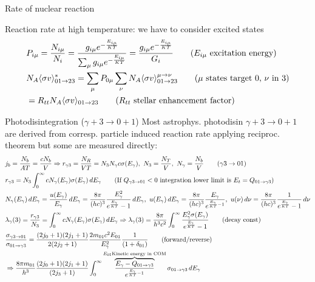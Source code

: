 \begin{frame}{Rate of nuclear reaction}
\begin{block}{Reaction rate at high temperature: we have to consider excited states}
        \begin{align*}
        &P_{i\mu}=\frac{N_{i\mu}}{N_i}=\frac{g_{i\mu}\exp{-\frac{E_{i\mu}}{KT}}}{\sum_{\mu}g_{i\mu}\exp{-\frac{E_{i\mu}}{KT}}}=\frac{g_{i\mu}\exp{-\frac{E_{i\mu}}{KT}}}{G_i}\tag{$E_{i\mu}$ excitation energy}\\
        &N_A\exv{\sigma v}^*_{01\to23}=\sum_{\mu}P_{0\mu}\sum_{\nu}N_A\exv{\sigma v}^{\mu\to\nu}_{01\to23}\tag{$\mu$ states target 0, $\nu$ in 3}\\
        &=R_{tt}N_A\exv{\sigma v}_{01\to23}\tag{$R_{tt}$ stellar enhancement factor}
    \end{align*}
    \end{block}
\end{frame}

\begin{frame}{Photodisintegration ($\gamma+3\to0+1$)}
    Most astrophys. photodisin $\gamma+3\to0+1$ are derived from corresp. particle induced reaction rate applying reciproc. theorem but some are measured directly:
    \begin{align*}
        &j_b=\frac{N_b}{AT}=\frac{cN_b}{V}\Rightarrow r_{\gamma3}=\frac{N_R}{VT}=N_3N_{\gamma}c\sigma(E_{\gamma}),\ N_3=\frac{N_T}{V},\ N_{\gamma}=\frac{N_b}{V}\tag{$\gamma3\to01$}\\
        &r_{\gamma3}=N_3\int_0^{\infty}cN_{\gamma}(E_{\gamma})\sigma(E_{\gamma})\,dE_{\gamma}\tag{If $Q_{\gamma3\to01}<0$ integration lower limit is $E_t=Q_{01\to\gamma3}$}\\
        &N_{\gamma}(E_{\gamma})\,dE_{\gamma}=\frac{u(E_{\gamma})}{E_{\gamma}}\,dE_{\gamma}=\frac{8\pi}{(hc)^3}\frac{E_{\gamma}^2}{\exp{\frac{E_{\gamma}}{KT}}-1}\,dE_{\gamma},\ u(E_{\gamma})\,dE_{\gamma}=\frac{8\pi}{(hc)^3}\frac{E_{\gamma}}{\exp{\frac{E_{\gamma}}{KT}-1}},\ u(\nu)\,d\nu=\frac{8\pi}{(hc)^3}\frac{1}{\exp{\frac{E_{\gamma}}{KT}}-1}\,d\nu\\
        &\lambda_{\gamma}(3)=\frac{r_{\gamma3}}{N_3}=\int_0^{\infty}cN_{\gamma}(E_{\gamma})\sigma(E_{\gamma})\,dE_{\gamma}\Rightarrow\lambda_{\gamma}(3)=\frac{8\pi}{h^3c^2}\int_0^{\infty}\frac{E_{\gamma}^2\sigma(E_{\gamma})}{\exp{\frac{E_{\gamma}}{KT}}-1}\tag{decay const}\\
        &\frac{\sigma_{\gamma3\to01}}{\sigma_{01\to\gamma3}}=\frac{(2j_0+1)(2j_1+1)}{2(2j_2+1)}\frac{2m_{01}c^2E_{01}}{E_{\gamma}^2}\frac{1}{(1+\delta_{01})}\tag{forward/reverse}\\
        &\Rightarrow \frac{8\pi m_{01}}{h^3}\frac{(2j_0+1)(2j_1+1)}{(2j_3+1)}\int_0^{\infty}\overbrace{\frac{E_{\gamma}-Q_{01\to\gamma3}}{\exp{\frac{E_{\gamma}}{KT}-1}}}^{E_{01} \text{Kinetic energy in COM}}\sigma_{01\to\gamma3}\,dE_{\gamma}\\

\end{align*}
\end{frame}
